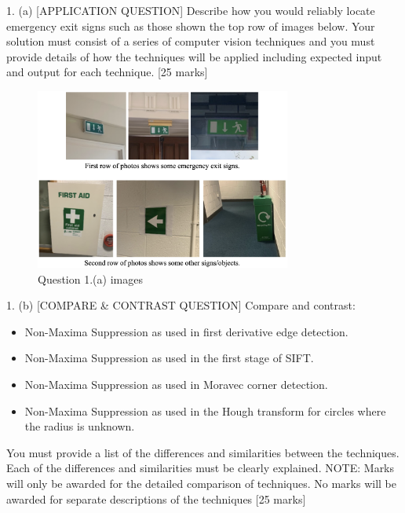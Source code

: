 \documentclass[a4paper]{article}
\begin{document}
1. (a) [APPLICATION QUESTION] Describe how you would reliably locate emergency exit signs such as those shown the top row of images below.  Your solution must consist of a series of computer vision techniques and you must provide details of how the techniques will be applied including expected input and output for each technique.   [25 marks] 
\begin{figure}[H]
    \centering
    \includegraphics[width=0.75\textwidth]{q1a.png}
    \caption[1.(a)]{Question 1.(a) images}
    \label{fig:q1a-fig}
\end{figure}


1. (b) [COMPARE \& CONTRAST QUESTION] Compare and contrast: 
\begin{itemize}
    \item Non-Maxima Suppression as used in first derivative edge detection. 
    \item Non-Maxima Suppression as used in the first stage of SIFT. 
    \item Non-Maxima Suppression as used in Moravec corner detection. 
    \item Non-Maxima Suppression as used in the Hough transform for circles where the radius is unknown.  
\end{itemize}

You must provide a list of the differences and similarities between the techniques.   Each of the differences and similarities must be clearly explained.  NOTE:  Marks will only be awarded for the detailed comparison of techniques.  No marks will be awarded for separate descriptions of the techniques                    [25 marks] 
\end{document}
